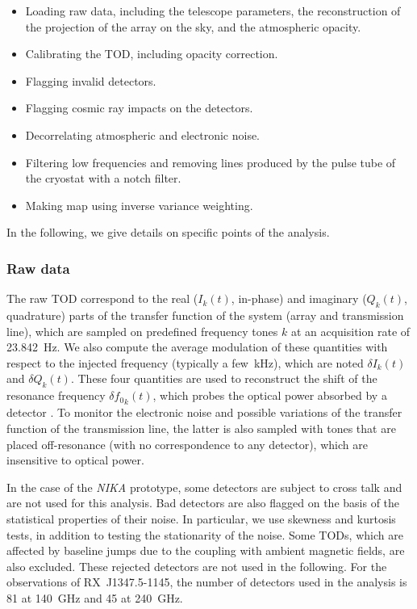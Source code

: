 \begin{itemize}
\item Loading raw data, including the telescope parameters, the reconstruction of the projection of the array on the sky, and the atmospheric opacity.
\item Calibrating the TOD, including opacity correction.
\item Flagging invalid detectors.
\item Flagging cosmic ray impacts on the detectors.
\item Decorrelating atmospheric and electronic noise.
\item Filtering low frequencies and removing lines produced by the pulse tube of the cryostat with a notch filter.
\item Making map using inverse variance weighting.
\end{itemize}
In the following, we give details on specific points of the analysis.

\subsubsection{Raw data}
The raw TOD correspond to the real ($I_k(t)$, in-phase) and imaginary ($Q_k(t)$, quadrature) parts of the transfer function of the system (array and transmission line), which are sampled on predefined frequency tones $k$ at an acquisition rate of 23.842~Hz. We also compute the average modulation of these quantities with respect to the injected frequency (typically a few~kHz), which are noted $\delta I_k(t)$ and $\delta Q_k(t)$. These four quantities are used to reconstruct the shift of the resonance frequency ${\delta f_0}_k (t)$, which probes the optical power absorbed by a detector \citep[see][for more details]{RFdIdQ}. To monitor the electronic noise and possible variations of the transfer function of the transmission line, the latter is also sampled with tones that are placed off-resonance (with no correspondence to any detector), which are insensitive to optical power.

In the case of the {\it NIKA} prototype, some detectors are subject to cross talk and are not used for this analysis. Bad detectors are also flagged on the basis of the statistical properties of their noise. In particular, we use skewness and kurtosis tests, in addition to testing the stationarity of the noise. Some TODs, which are affected by baseline jumps due to the coupling with ambient magnetic fields, are also excluded. These rejected detectors are not used in the following. For the observations of \mbox{RX~J1347.5-1145}, the number of detectors used in the analysis is 81 at 140~GHz and 45 at 240~GHz.

